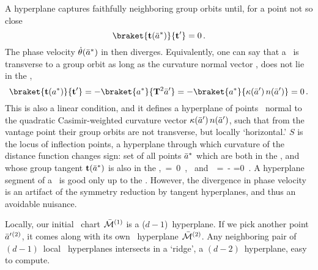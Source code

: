 \documentclass{jfm}
\begin{document}
A hyperplane captures faithfully neighboring group orbits until,
for a point not so close
\[
\braket{\groupTan(\sspRSing)}{\sliceTan{}}= 0
\,.
\]
%
The phase velocity $\dot{{\bf \theta}}(\bar{a}^*)$ in
 then diverges. Equivalently,
one can say that a \slice\ is transverse to a group orbit as long as the
curvature normal vector , does not lie in the \slice,
\[
\braket{\groupTan(\sspSing)}{\sliceTan{}}
 =
-\braket{\sspSing}{\Lg^2\slicep}
 =
-\braket{\sspSing}{\kappa(\slicep) \, {n}(\slicep)}
 = 0
\,.
\]
This is also a linear condition, and it defines a hyperplane of points
\sspSing\ normal to  the quadratic Casimir-weighted curvature vector
$\kappa(\bar{a}') \, {n}(\bar{a}')$, such that from the {\template} vantage
point their group orbits are not transverse, but locally `horizontal.'
{\Sset} $S$ is the locus of inflection points, a hyperplane through which
curvature of the distance function changes sign: set of all points
$\bar{a}^*$ which are both in the {\slice}, and whose group tangent
$\mathbf{t}(\bar{a}^*)$ is also in the  {\slice},
\beq
\braket{\sspRSing}{\sliceTan{}} \,=\, 0
    \,, \mbox{ and }
\braket{\groupTan(\sspRSing)}{\sliceTan{}}
 \,=\,
-
 =0
\,.
\label{sliceSingl0}
\eeq
A hyperplane segment of a \slice\ is good only up to the \sset. However,
the divergence in phase velocity  is an artifact of
the symmetry reduction by tangent hyperplanes, and thus an avoidable
nuisance.

Locally, our initial \slice\ chart $\pSRed{}^{(1)}$ is a ($d\!-\!1$)\dmn\ hyperplane.
If
we pick another {\template} point $\bar{a}'{}^{(2)}$, it comes along with
its own \slice\ hyperplane $\pSRed{}^{(2)}$.
Any neighboring pair of
$(d\!-\!1)$\dmn\ local \slice\ hyperplanes intersects in a `ridge',
a $(d\!-\!2)$\dmn\ hyperplane, easy to compute.
\end{document}
